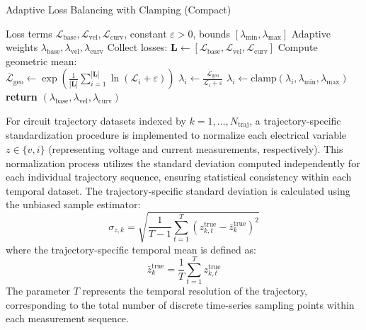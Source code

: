 \documentclass[lettersize,journal]{IEEEtran}
\begin{document}
\begin{algorithm}[!t]
  \caption{Adaptive Loss Balancing with Clamping (Compact)}
  \label{alg:adaptive_loss_balancing}
  \begin{algorithmic}[1]
    \REQUIRE Loss terms \(\mathcal{L}_{\text{base}}, \mathcal{L}_{\text{vel}}, \mathcal{L}_{\text{curv}}\), constant \(\varepsilon > 0\), bounds \([\lambda_{\min}, \lambda_{\max}]\)
    \ENSURE Adaptive weights \(\lambda_{\text{base}}, \lambda_{\text{vel}}, \lambda_{\text{curv}}\)
    \STATE Collect losses: \(\mathbf{L} \gets [\mathcal{L}_{\text{base}}, \mathcal{L}_{\text{vel}}, \mathcal{L}_{\text{curv}}]\)
    \STATE Compute geometric mean: \\ \(\overline{\mathcal{L}}_{\text{geo}} \gets \exp\left(\frac{1}{|\mathbf{L}|} \sum_{i=1}^{|\mathbf{L}|} \ln(\mathcal{L}_i + \varepsilon)\right)\)
    \STATE \(\lambda_i \gets \frac{\overline{\mathcal{L}}_{\text{geo}}}{\mathcal{L}_i + \varepsilon}\)
    \STATE \(\lambda_i \gets \text{clamp}(\lambda_i, \lambda_{\min}, \lambda_{\max})\)
    \ENDFOR
    \STATE \textbf{return} \((\lambda_{\text{base}}, \lambda_{\text{vel}}, \lambda_{\text{curv}})\)
  \end{algorithmic}
\end{algorithm}

For circuit trajectory datasets indexed by \(k = 1, \ldots, N_{\text{traj}}\), a trajectory-specific standardization procedure is implemented to normalize each electrical variable \(z \in \{v, i\}\) (representing voltage and current measurements, respectively). This normalization process utilizes the standard deviation computed independently for each individual trajectory sequence, ensuring statistical consistency within each temporal dataset.
The trajectory-specific standard deviation is calculated using the unbiased sample estimator:
\begin{equation}
  \sigma_{z,k} = \sqrt{\frac{1}{T-1} \sum_{t=1}^{T} \left(z_{k,t}^{\mathrm{true}} - \bar{z}_k^{\mathrm{true}}\right)^2}
\end{equation}
where the trajectory-specific temporal mean is defined as:
\begin{equation}
  \bar{z}_k^{\mathrm{true}} = \frac{1}{T} \sum_{t=1}^{T} z_{k,t}^{\mathrm{true}}
\end{equation}
The parameter \(T\) represents the temporal resolution of the trajectory, corresponding to the total number of discrete time-series sampling points within each measurement sequence.
\end{document}

